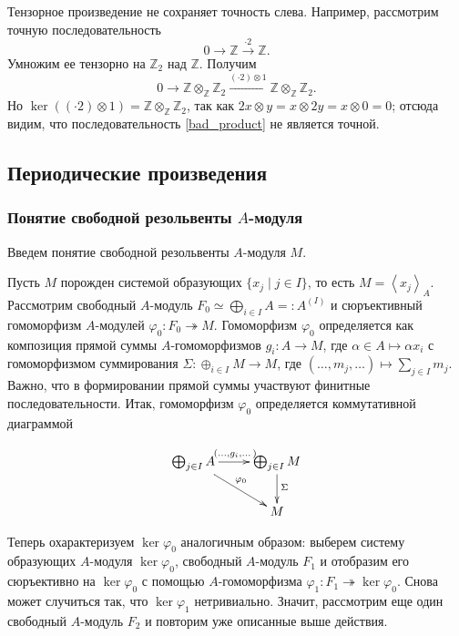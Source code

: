     Тензорное произведение не сохраняет точность слева. Например, рассмотрим точную последовательность
    \begin{equation*}
        0 \rightarrow \mathbb{Z} \xrightarrow{\cdot 2} \mathbb{Z}.
    \end{equation*}
    Умножим ее тензорно на $\mathbb{Z}_2$ над $\mathbb{Z}$. Получим
    \begin{equation} \label{bad_product}
        0 \rightarrow \mathbb{Z} \otimes_\mathbb{Z} \mathbb{Z}_2 \xrightarrow{(\cdot 2) \otimes 1} \mathbb{Z} \otimes_\mathbb{Z} \mathbb{Z}_2.
    \end{equation}
    Но $\ker((\cdot 2) \otimes 1) = \mathbb{Z} \otimes_\mathbb{Z} \mathbb{Z}_2$, так как $2x \otimes y = x \otimes 2y = x \otimes 0 = 0$; отсюда видим, 
    что последовательность \eqref{bad_product} не является точной.

    \subsection{Периодические произведения}

    \subsubsection{Понятие свободной резольвенты $A$-модуля}
    Введем понятие свободной резольвенты $A$-модуля $M$. 
    
    Пусть $M$ порожден системой образующих $\{x_j \mid j \in I\}$, то есть $M = \left<x_j \right>_A$.
    Рассмотрим свободный $A$-модуль $F_0 \simeq \bigoplus_{i\in I} A =: A^{(I)}$ и сюръективный гомоморфизм $A$-модулей $\varphi_0 : F_0 \twoheadrightarrow M$. Гомоморфизм
    $\varphi_0$ определяется как композиция прямой суммы $A$-гомоморфизмов $g_i : A \rightarrow M$, где $\alpha \in A \mapsto \alpha x_i$ с гомоморфизмом суммирования
    $\Sigma : \oplus_{i \in I}M \rightarrow M$, где $(\dots, m_j, \dots) \mapsto \sum_{j \in I} m_j$. Важно, что в формировании прямой суммы участвуют финитные последовательности.
    Итак, гомоморфизм $\varphi_0$ определяется коммутативной диаграммой

    $$        
        \xymatrix{
            \bigoplus_{j \in I} A \ar[r]^{(\dots, g_i, \dots)} \ar[rd]^{\varphi_0}
            &\bigoplus_{j \in I} M \ar[d]^{\Sigma}\\
            &M
        }
    $$

    Теперь охарактеризуем $\ker \varphi_0$ аналогичным образом: выберем систему образующих $A$-модуля $\ker \varphi_0$, свободный $A$-модуль $F_1$ и отобразим его сюръективно на 
    $\ker \varphi_0$ с помощью $A$-гомоморфизма  $\varphi_1 : F_1 \twoheadrightarrow \ker \varphi_0$. Снова может случиться так, что $\ker \varphi_1$ нетривиально. Значит, рассмотрим еще один свободный $A$-модуль $F_2$
    и повторим уже описанные выше действия. 

